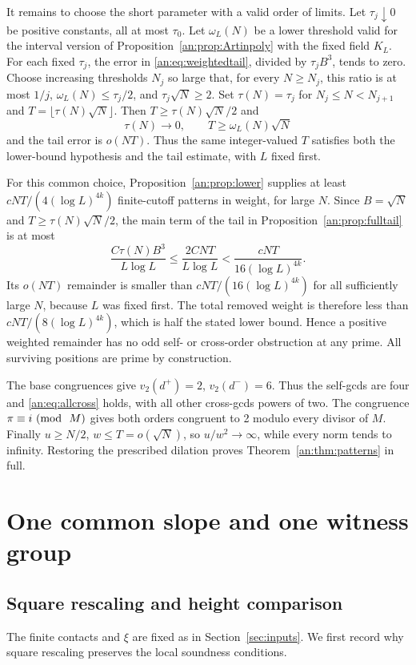 \documentclass[11pt,reqno]{amsart}
\theoremstyle{definition}
\numberwithin{equation}{section}
\def\mo{{\rm{mod}\ }}
\def\pmod#1{\ (\mo\ #1)}
\begin{document}
It remains to choose the short parameter with a valid order of limits. Let $\tau_j\downarrow0$ be positive constants, all at most $\tau_0$. Let $\omega_L(N)$ be a lower threshold valid for the interval version of Proposition~\ref{an:prop:Artinpoly} with the fixed field $K_L$. For each fixed $\tau_j$, the error in \eqref{an:eq:weightedtail}, divided by $\tau_jB^3$, tends to zero. Choose increasing thresholds $N_j$ so large that, for every $N\ge N_j$, this ratio is at most $1/j$, $\omega_L(N)\le\tau_j/2$, and $\tau_j\sqrt N\ge2$. Set $\tau(N)=\tau_j$ for $N_j\le N<N_{j+1}$ and $T=\lfloor\tau(N)\sqrt N\rfloor$. Then $T\ge\tau(N)\sqrt N/2$ and
\[
 \tau(N)\longrightarrow0,\qquad T\ge\omega_L(N)\sqrt N
\]
and the tail error is $o(NT)$. Thus the same integer-valued $T$ satisfies both the lower-bound hypothesis and the tail estimate, with $L$ fixed first.

For this common choice, Proposition~\ref{an:prop:lower} supplies at least
$cNT/(4(\log L)^{4k})$ finite-cutoff patterns in weight, for large $N$. Since $B=\sqrt N$ and $T\ge\tau(N)\sqrt N/2$, the main term of the tail in Proposition~\ref{an:prop:fulltail} is at most
\[
 \frac{C\tau(N)B^3}{L\log L}
 \le\frac{2CNT}{L\log L}
 <\frac{cNT}{16(\log L)^{4k}}.
\]
Its $o(NT)$ remainder is smaller than $cNT/(16(\log L)^{4k})$ for all sufficiently large $N$, because $L$ was fixed first. The total removed weight is therefore less than $cNT/(8(\log L)^{4k})$, which is half the stated lower bound. Hence a positive weighted remainder has no odd self- or cross-order obstruction at any prime. All surviving positions are prime by construction.

The base congruences give $v_2(d^+)=2$, $v_2(d^-)=6$. Thus the self-gcds are four and \eqref{an:eq:allcross} holds, with all other cross-gcds powers of two. The congruence $\pi\equiv i\pmod M$ gives both orders congruent to 2 modulo every divisor of $M$. Finally $u\ge N/2$, $w\le T=o(\sqrt N)$, so $u/w^2\to\infty$, while every norm tends to infinity. Restoring the prescribed dilation proves Theorem~\ref{an:thm:patterns} in full.


\section{One common slope and one witness group}\label{sec:batches}
\subsection{Square rescaling and height comparison}
The finite contacts and $\xi$ are fixed as in Section~\ref{sec:inputs}. We first record why square rescaling preserves the local soundness conditions.
\end{document}
